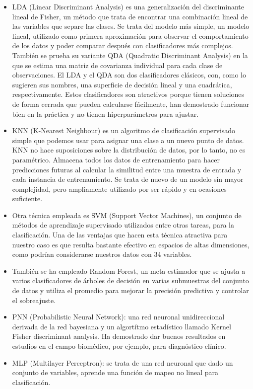 \documentclass{article}
\begin{document}
\begin{itemize}
\item
LDA (Linear Discriminant Analysis) es una generalización del
discriminante lineal de Fisher, un método que trata de encontrar una
combinación lineal de las variables que separe las clases. Se trata
del modelo más simple, un modelo lineal, utilizado como primera
aproximación para observar el comportamiento de los datos y poder
comparar después con clasificadores más complejos. También se prueba
su variante QDA (Quadratic Discriminant Analysis) en la que se estima
una matriz de covarianza individual para cada clase de observaciones.
El LDA y el QDA son dos clasificadores clásicos, con, como lo sugieren
sus nombres, una superficie de decisión lineal y una cuadrática,
respectivamente. Estos clasificadores son atractivos porque tienen
soluciones de forma cerrada que pueden calcularse fácilmente, han
demostrado funcionar bien en la práctica y no tienen hiperparámetros
para ajustar.\cite{scikit-learn}

\item

KNN (K-Nearest Neighbour) es un algoritmo de clasificación supervisado
simple que podemos usar para asignar una clase a un
nuevo punto de datos. KNN no hace suposiciones sobre
la distribución de datos, por lo tanto, no es
paramétrico. Almacena todos los datos de entrenamiento
para hacer predicciones futuras al calcular la
similitud entre una muestra de entrada y cada
instancia de entrenamiento. Se trata de nuevo de un
modelo sin mayor complejidad, pero ampliamente
utilizado por ser rápido y en ocasiones suficiente.
\item

Otra técnica empleada es SVM (Support Vector Machines), un
conjunto de métodos de aprendizaje supervisado
utilizados entre otras tareas, para la clasificación.
Una de las ventajas que hacen esta técnica atractiva
para nuestro caso es que resulta bastante efectivo en
espacios de altas dimensiones, como podrían
considerarse nuestros datos con 34 variables.\cite{scikit-learn}

\item
También se ha empleado Random Forest, un meta estimador que se ajusta
		a varios clasificadores de árboles de decisión en
		varias submuestras del conjunto de datos y utiliza el
		promedio para mejorar la precisión predictiva y
		controlar el sobreajuste.

\item

PNN (Probabilistic Neural Network): una red neuronal unidireccional
		derivada de la red bayesiana y un algortítmo
		estadístico llamado Kernel Fisher discriminant
		analysis. Ha demostrado dar buenos resultados en
		estudios en el campo biomédico, por ejemplo, para
		diagnóstico clínico.\cite{Wang2010}

\item

 MLP (Multilayer Perceptron): se trata de una red neuronal que dado un
		conjunto de variables, aprende una función de mapeo no
		lineal para clasificación.

\end{itemize}
\end{document}
